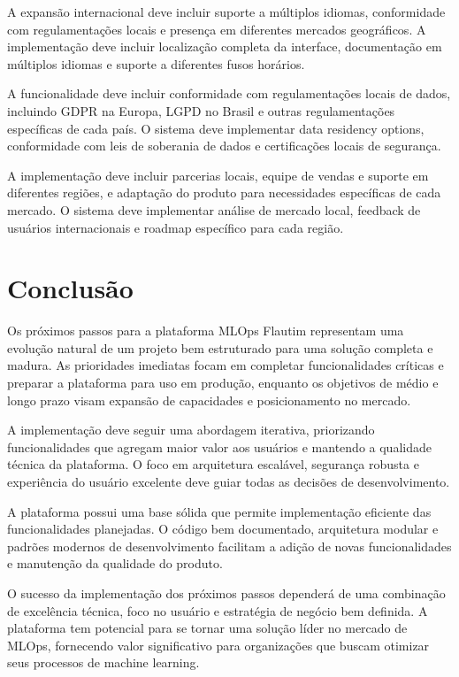 \documentclass[12pt,a4paper]{article}
\begin{document}
A expansão internacional deve incluir suporte a múltiplos idiomas, conformidade com regulamentações locais e presença em diferentes mercados geográficos. A implementação deve incluir localização completa da interface, documentação em múltiplos idiomas e suporte a diferentes fusos horários.

A funcionalidade deve incluir conformidade com regulamentações locais de dados, incluindo GDPR na Europa, LGPD no Brasil e outras regulamentações específicas de cada país. O sistema deve implementar data residency options, conformidade com leis de soberania de dados e certificações locais de segurança.

A implementação deve incluir parcerias locais, equipe de vendas e suporte em diferentes regiões, e adaptação do produto para necessidades específicas de cada mercado. O sistema deve implementar análise de mercado local, feedback de usuários internacionais e roadmap específico para cada região.

\section{Conclusão}

Os próximos passos para a plataforma MLOps Flautim representam uma evolução natural de um projeto bem estruturado para uma solução completa e madura. As prioridades imediatas focam em completar funcionalidades críticas e preparar a plataforma para uso em produção, enquanto os objetivos de médio e longo prazo visam expansão de capacidades e posicionamento no mercado.

A implementação deve seguir uma abordagem iterativa, priorizando funcionalidades que agregam maior valor aos usuários e mantendo a qualidade técnica da plataforma. O foco em arquitetura escalável, segurança robusta e experiência do usuário excelente deve guiar todas as decisões de desenvolvimento.

A plataforma possui uma base sólida que permite implementação eficiente das funcionalidades planejadas. O código bem documentado, arquitetura modular e padrões modernos de desenvolvimento facilitam a adição de novas funcionalidades e manutenção da qualidade do produto.

O sucesso da implementação dos próximos passos dependerá de uma combinação de excelência técnica, foco no usuário e estratégia de negócio bem definida. A plataforma tem potencial para se tornar uma solução líder no mercado de MLOps, fornecendo valor significativo para organizações que buscam otimizar seus processos de machine learning.
\end{document}
